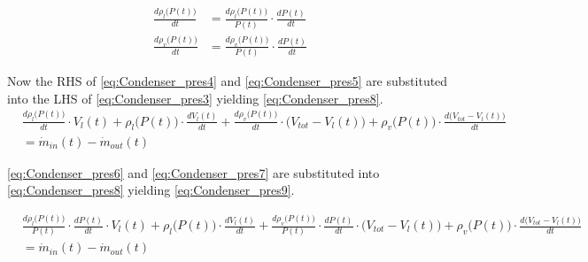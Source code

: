 \begin{align}
	\frac{d \rho_{l}\bigl(P(t)\bigr)}{dt} 				& =   \frac{d \rho_{l}\bigl(P(t)\bigr)}{P(t)} \cdot \frac{dP(t)}{dt}	\label{eq:Condenser_pres6} \\
		\frac{d \rho_{v}\bigl(P(t)\bigr)}{dt} 			& =   \frac{d \rho_{v}\bigl(P(t)\bigr)}{P(t)} \cdot \frac{dP(t)}{dt}	\label{eq:Condenser_pres7}
\end{align}

Now the RHS of \cref{eq:Condenser_pres4} and \cref{eq:Condenser_pres5} are substituted into the LHS of \cref{eq:Condenser_pres3} yielding \cref{eq:Condenser_pres8}. \\


\begin{equation}\label{eq:Condenser_pres8}
	\begin{split}
		& \frac{d \rho_{l}\bigl(P(t)\bigr)}{dt} \cdot V_l(t)   +   \rho_{l}\bigl(P(t)\bigr)\cdot\frac{d V_l(t)}{dt} +
		\frac{d \rho_{v}\bigl(P(t)\bigr)}{dt} \cdot \bigl(V_{tot} - V_l(t)\bigr)   +   \rho_{v}\bigl(P(t)\bigr)\cdot\frac{d \bigl(V_{tot} - V_l(t)\bigr)}{dt} \\
		& = \dot{m}_{in}(t) - \dot{m}_{out}(t)
	\end{split}
\end{equation}


\cref{eq:Condenser_pres6} and \cref{eq:Condenser_pres7} are substituted into \cref{eq:Condenser_pres8} yielding \cref{eq:Condenser_pres9}.

\begin{equation}\label{eq:Condenser_pres9}
	\begin{split}
		& \frac{d \rho_{l}\bigl(P(t)\bigr)}{P(t)} \cdot \frac{dP(t)}{dt} \cdot V_l(t)   +   \rho_{l}\bigl(P(t)\bigr)\cdot\frac{d V_l(t)}{dt} +  \frac{d \rho_{v}\bigl(P(t)\bigr)}{P(t)} \cdot \frac{dP(t)}{dt} \cdot \bigl(V_{tot} - V_l(t)\bigr)   +
		\rho_{v}\bigl(P(t)\bigr)\cdot\frac{d \bigl(V_{tot} - V_l(t)\bigr)}{dt}  \\ &= \dot{m}_{in}(t) - \dot{m}_{out}(t)
	\end{split}
\end{equation}

